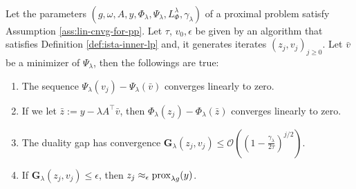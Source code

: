 \documentclass[12pt]{article}
\begin{document}
        \begin{proposition}\;\label{prop:inn-loop-lin-cnvg}\\
            Let the parameters $(g, \omega, A, y, \Phi_\lambda, \Psi_\lambda, L^\lambda_{\Phi} ,\gamma_\lambda)$ of a proximal problem satisfy Assumption \ref{ass:lin-cnvg-for-pp}. 
            Let $\tau$, $v_0, \epsilon$ be given by an algorithm that satisfies Definition \ref{def:ista-inner-lp} and, it generates iterates $(z_j, v_j)_{j \ge 0}$. 
            Let $\bar v$ be a minimizer of $\Psi_\lambda$, then the followings are true: 
            \begin{enumerate}[nosep]
                \item The sequence $\Psi_\lambda(v_j) - \Psi_\lambda(\bar v)$ converges linearly to zero. \label{prop:inn-looplin-cnvg-item1}
                \item If we let $\bar z := y - \lambda A^\top \bar v$, then $\Phi_\lambda(z_j) - \Phi_\lambda(\bar z)$ converges linearly to zero. \label{prop:inn-looplin-cnvg-item2}
                \item The duality gap has convergence $\mathbf G_\lambda(z_j, v_j) \le \mathcal O\left(\left(1 - \frac{\gamma_\lambda}{2\tau}\right)^{j/2}\right)$. \label{prop:inn-looplin-cnvg-item3}
                \item If $\mathbf G_\lambda(z_j, v_j) \le \epsilon$, then $z_j \approx_\epsilon \operatorname{prox}_{\lambda g}(y)$. \label{prop:inn-looplin-cnvg-item4}
            \end{enumerate}
        \end{proposition}
\end{document}
